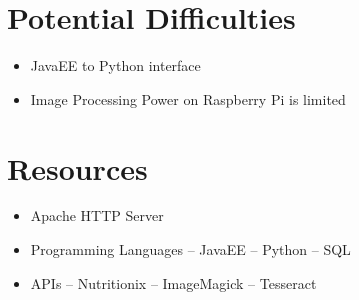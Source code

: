 \documentclass[10pt]{article}
\begin{document}
\section{Potential Difficulties}
\begin{itemize}
	\item JavaEE to Python interface
	\item Image Processing Power on Raspberry Pi is limited
\end{itemize}
\section{Resources}
\begin{itemize}
	\item Apache HTTP Server
	\item Programming Languages
	\subitem -- JavaEE
	\subitem -- Python 
	\subitem -- SQL
	
	\item APIs
	\subitem -- Nutritionix
	\subitem -- ImageMagick
	\subitem -- Tesseract
\end{itemize}
\end{document}
